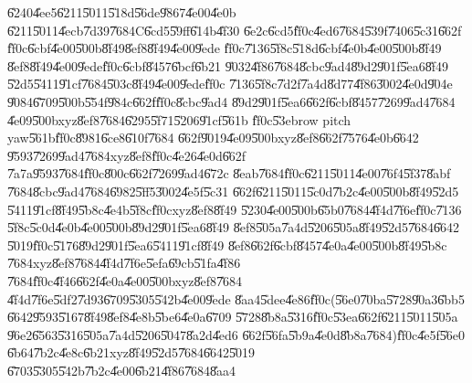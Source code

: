 \documentclass[12pt,a4paper]{article}
\begin{document}
\U{6240}\U{4ee5}\U{6211}\U{5011}\U{518d}\U{56de}\U{9867}\U{4e00}\U{4e0b}%
\U{6211}\U{5011}\U{4ecb}\U{7d39}\U{7684}C\U{6cd5}\U{59ff}\U{614b}\U{4f30}%
\U{6e2c}\U{6cd5}\U{ff0c}\U{4ed6}\U{7684}\U{539f}\U{7406}\U{5c31}\U{662f}%
\U{ff0c}\U{6cbf}\U{4e00}\U{500b}\U{8f49}\U{8ef8}\U{8f49}\U{4e00}\U{9ede}%
\U{ff0c}\U{7136}\U{5f8c}\U{518d}\U{6cbf}\U{4e0b}\U{4e00}\U{500b}\U{8f49}%
\U{8ef8}\U{8f49}\U{4e00}\U{9ede}\U{ff0c}\U{6cbf}\U{8457}\U{6bcf}\U{6b21}%
\U{9032}\U{4f86}\U{7684}\U{8cbc}\U{9ad4}\U{89d2}\U{901f}\U{5ea6}\U{8f49}%
\U{52d5}\U{5411}\U{91cf}\U{7684}\U{503c}\U{8f49}\U{4e00}\U{9ede}\U{ff0c}%
\U{7136}\U{5f8c}\U{7d2f}\U{7a4d}\U{8d77}\U{4f86}\U{3002}\U{4e0d}\U{904e}%
\U{9084}\U{6709}\U{500b}\U{554f}\U{984c}\U{662f}\U{ff0c}\U{8cbc}\U{9ad4}%
\U{89d2}\U{901f}\U{5ea6}\U{662f}\U{6cbf}\U{8457}\U{7269}\U{9ad4}\U{7684}%
\U{4e09}\U{500b}xyz\U{8ef8}\U{7684}\U{6295}\U{5f71}\U{5206}\U{91cf}\U{561b}%
\U{ff0c}\U{53eb}row pitch yaw\U{561b}\U{ff0c}\U{8981}\U{6ce8}\U{610f}\U{7684}%
\U{662f}\U{9019}\U{4e09}\U{500b}xyz\U{8ef8}\U{662f}\U{7576}\U{4e0b}\U{6642}%
\U{9593}\U{7269}\U{9ad4}\U{7684}xyz\U{8ef8}\U{ff0c}\U{4e26}\U{4e0d}\U{662f}%
\U{7a7a}\U{9593}\U{7684}\U{ff0c}\U{800c}\U{662f}\U{7269}\U{9ad4}\U{672c}%
\U{8eab}\U{7684}\U{ff0c}\U{6211}\U{5011}\U{4e00}\U{76f4}\U{5f37}\U{8abf}%
\U{7684}\U{8cbc}\U{9ad4}\U{7684}\U{6982}\U{5ff5}\U{3002}\U{4e5f}\U{5c31}%
\U{662f}\U{6211}\U{5011}\U{5c0d}\U{7b2c}\U{4e00}\U{500b}\U{8f49}\U{52d5}%
\U{5411}\U{91cf}\U{8f49}\U{5b8c}\U{4e4b}\U{5f8c}\U{ff0c}xyz\U{8ef8}\U{8f49}%
\U{5230}\U{4e00}\U{500b}\U{65b0}\U{7684}\U{4f4d}\U{7f6e}\U{ff0c}\U{7136}%
\U{5f8c}\U{5c0d}\U{4e0b}\U{4e00}\U{500b}\U{89d2}\U{901f}\U{5ea6}\U{8f49}%
\U{8ef8}\U{505a}\U{7a4d}\U{5206}\U{505a}\U{8f49}\U{52d5}\U{7684}\U{6642}%
\U{5019}\U{ff0c}\U{5176}\U{89d2}\U{901f}\U{5ea6}\U{5411}\U{91cf}\U{8f49}%
\U{8ef8}\U{662f}\U{6cbf}\U{8457}\U{4e0a}\U{4e00}\U{500b}\U{8f49}\U{5b8c}%
\U{7684}xyz\U{8ef8}\U{7684}\U{4f4d}\U{7f6e}\U{5efa}\U{69cb}\U{51fa}\U{4f86}%
\U{7684}\U{ff0c}\U{4f46}\U{662f}\U{4e0a}\U{4e00}\U{500b}xyz\U{8ef8}\U{7684}%
\U{4f4d}\U{7f6e}\U{5df2}\U{7d93}\U{6709}\U{5305}\U{542b}\U{4e00}\U{9ede}%
\U{8aa4}\U{5dee}\U{4e86}\U{ff0c}(\U{56e0}\U{70ba}\U{5728}\U{90a3}\U{6bb5}%
\U{6642}\U{9593}\U{5167}\U{8f49}\U{8ef8}\U{4e8b}\U{5be6}\U{4e0a}\U{6709}%
\U{5728}\U{8b8a}\U{5316}\U{ff0c}\U{53ea}\U{662f}\U{6211}\U{5011}\U{505a}%
\U{96e2}\U{6563}\U{5316}\U{505a}\U{7a4d}\U{5206}\U{5047}\U{8a2d}\U{4ed6}%
\U{662f}\U{56fa}\U{5b9a}\U{4e0d}\U{8b8a}\U{7684})\U{ff0c}\U{4e5f}\U{56e0}%
\U{6b64}\U{7b2c}\U{4e8c}\U{6b21}xyz\U{8f49}\U{52d5}\U{7684}\U{6642}\U{5019}%
\U{6703}\U{5305}\U{542b}\U{7b2c}\U{4e00}\U{6b21}\U{4f86}\U{7684}\U{8aa4}%
\end{document}
